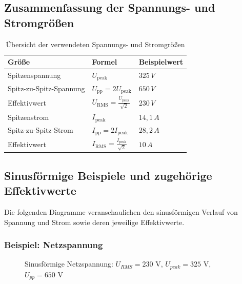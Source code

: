 \subsection{Zusammenfassung der Spannungs- und Stromgrö{\ss}en}
	\begin{table}[H]
		\centering
		\begin{tabular}{|l|l|l|}
			\hline
			\textbf{Grö{\ss}e} & \textbf{Formel} & \textbf{Beispielwert} \\
			\hline
			Spitzenspannung & $U_\text{peak}$ & $325\,V$ \\
			Spitz-zu-Spitz-Spannung & $U_\text{pp} = 2U_\text{peak}$ & $650\,V$ \\
			Effektivwert & $U_\text{RMS} = \tfrac{U_\text{peak}}{\sqrt{2}}$ & $230\,V$ \\
			\hline
			Spitzenstrom & $I_\text{peak}$ & $14{,}1\,A$ \\
			Spitz-zu-Spitz-Strom & $I_\text{pp} = 2I_\text{peak}$ & $28{,}2\,A$ \\
			Effektivwert & $I_\text{RMS} = \tfrac{I_\text{peak}}{\sqrt{2}}$ & $10\,A$ \\
			\hline
		\end{tabular}
		\caption{Übersicht der verwendeten Spannungs- und Stromgrö{\ss}en}
		\label{tab:uebersicht-groessen}
	\end{table}
	
\subsection{Sinusförmige Beispiele und zugehörige Effektivwerte}
	Die folgenden Diagramme veranschaulichen den sinusförmigen Verlauf von Spannung und Strom sowie deren jeweilige Effektivwerte.
	
	\subsubsection{Beispiel: Netzspannung}
	
	\begin{figure}[H]
		\centering
		\caption{Sinusförmige Netzspannung: $U_{RMS}=230$ V, $U_{peak}=325$ V, $U_{pp}=650$ V}
		\label{fig:netzspannung}
	\end{figure}
	
